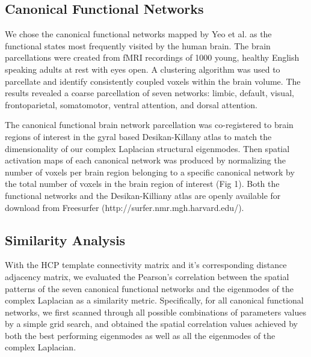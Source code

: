 \documentclass{article}
\begin{document}
\subsection{Canonical Functional Networks}
We chose the canonical functional networks mapped by Yeo et al. \cite{Yeo2011} as the functional states most frequently visited by the human brain. The brain parcellations were created from fMRI recordings of 1000 young, healthy English speaking adults at rest with eyes open. A clustering algorithm was used to parcellate and identify consistently coupled voxels within the brain volume. The results revealed a coarse parcellation of seven networks: limbic, default, visual, frontoparietal, somatomotor, ventral attention, and dorsal attention. 

The canonical functional brain network parcellation was co-registered to brain regions of interest in the gyral based Desikan-Killany atlas \cite{Desikan2006} to match the dimensionality of our complex Laplacian structural eigenmodes. Then spatial activation maps of each canonical network was produced by normalizing the number of voxels per brain region belonging to a specific canonical network by the total number of voxels in the brain region of interest (Fig 1). Both the functional networks and the Desikan-Killiany atlas are openly available for download from Freesurfer \cite{Fischl2012} (http://surfer.nmr.mgh.harvard.edu/).

\subsection{Similarity Analysis}
With the HCP template connectivity matrix and it's corresponding distance adjacency matrix, we evaluated the Pearson's correlation between the spatial patterns of the seven canonical functional networks and the eigenmodes of the complex Laplacian as a similarity metric. Specifically, for all canonical functional networks, we first scanned through all possible combinations of parameters values by a simple grid search, and obtained the spatial correlation values achieved by both the best performing eigenmodes as well as all the eigenmodes of the complex Laplacian. 
\end{document}
